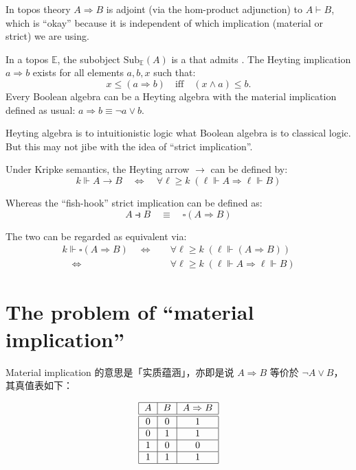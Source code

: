 In topos theory $A \Rightarrow B$ is adjoint (via the hom-product adjunction) to $A \vdash B$, which is ``okay'' because it is independent of which implication (material or strict) we are using.

In a topos $\mathbb{E}$, the subobject $\mathrm{Sub}_{\mathbb{E}}(A)$ is a  that admits .  The Heyting implication $a \Rightarrow b$ exists for all elements $a, b, x$ such that:
\begin{equation}
x \le (a \Rightarrow b) \quad \mbox{iff} \quad (x \wedge a) \le b.
\end{equation}
Every Boolean algebra can be a Heyting algebra with the material implication defined as usual: $a \Rightarrow b \equiv \neg a \vee b$.

Heyting algebra is to intuitionistic logic what Boolean algebra is to classical logic.  But this may not jibe with the idea of ``strict implication''.

Under Kripke semantics, the Heyting arrow $\rightarrow$ can be defined by:
\begin{equation}
k \Vdash A \rightarrow B \quad \Leftrightarrow \quad \forall \ell \ge k \; (\ell \Vdash A \Rightarrow \ell \Vdash B)
\end{equation}

Whereas the ``fish-hook'' strict implication can be defined as:
\begin{equation}
A \strictif B \quad \equiv \quad \square (A \Rightarrow B) 
\end{equation}

The two can be regarded as equivalent via:
\begin{equation}
\begin{aligned}
k \Vdash \square (A \Rightarrow B) \quad \Leftrightarrow \quad & \forall \ell \ge k \; (\ell \Vdash (A \Rightarrow B)) \\
\quad \Leftrightarrow \quad & \forall \ell \ge k \; (\ell \Vdash A \Rightarrow \ell \Vdash B)
\end{aligned}
\end{equation}

\section{The problem of ``material implication''}

Material implication 的意思是「实质蕴涵」，亦即是说 $A \Rightarrow B$ 等价於 $\neg A \vee B$，其真值表如下：

\begin{equation}
\label{eqn:implication-truth-table}
\begin{tabular}{|c|c|c|}
	\hline 
	$A$ & $B$ & $A \Rightarrow B$ \\ 
	\hline \hline 
	0 & 0 & 1 \\
	\hline 
	0 & 1 & 1 \\ 
	\hline 
	1 & 0 & 0 \\ 
	\hline 
	1 & 1 & 1 \\ 
	\hline 
\end{tabular} 
\end{equation}

